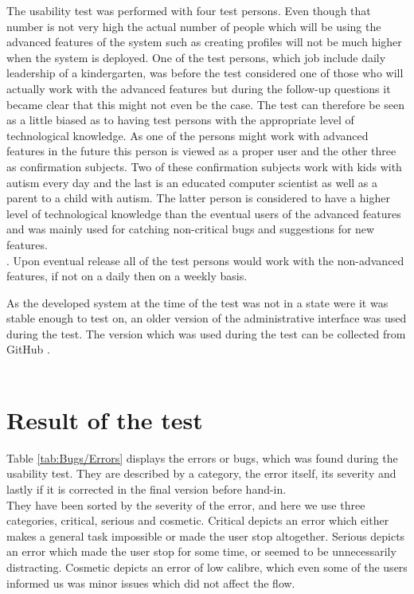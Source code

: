 The usability test was performed with four test persons. Even though that number is not very high the actual number of people which will be using the advanced features of the system such as creating profiles will not be much higher when the system is deployed. One of the test persons, which job include daily leadership of a kindergarten, was before the test considered one of those who will actually work with the advanced features but during the follow-up questions it became clear that this might not even be the case. The test can therefore be seen as a little biased as to having test persons with the appropriate level of technological knowledge. As one of the persons might work with advanced features in the future this person is viewed as a proper user and the other three as confirmation subjects. Two of these confirmation subjects work with kids with autism every day and the last is an educated computer scientist as well as a parent to a child with autism. The latter person is considered to have a higher level of technological knowledge than the eventual users of the advanced features and was mainly used for catching non-critical bugs and suggestions for new features.\\. Upon eventual release all of the test persons would work with the non-advanced features, if not on a daily then on a weekly basis.

As the developed system at the time of the test was not in a state were it was stable enough to test on, an older version of the administrative interface was used during the test. The version which was used during the test can be collected from GitHub \citep{testBranch}.\\
\\

\section{Result of the test}
Table \ref{tab:Bugs/Errors} displays the errors or bugs, which was found during the usability test. They are described by a category, the error itself, its severity and lastly if it is corrected in the final version before hand-in.\\
They have been sorted by the severity of the error, and here we use three categories, critical, serious and cosmetic. Critical depicts an error which either makes a general task impossible or made the user stop altogether. Serious depicts an error which made the user stop for some time, or seemed to be unnecessarily distracting. Cosmetic depicts an error of low calibre, which even some of the users informed us was minor issues which did not affect the flow.\\
\\

